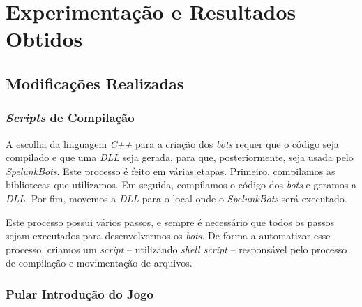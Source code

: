 \chapter{\label{chap:experimentation-and-results}Experimentação e Resultados Obtidos}


\section{\label{section:modifications}Modificações Realizadas}


\subsection{\textit{Scripts} de Compilação}

A escolha da linguagem \textit{C++} para a criação dos \textit{bots} requer que
o código seja compilado e que uma \textit{DLL} seja gerada, para que,
posteriormente, seja usada pelo \textit{SpelunkBots}. Este processo é feito em
várias etapas.  Primeiro, compilamos as bibliotecas que utilizamos. Em seguida,
compilamos o código dos \textit{bots} e geramos a \textit{DLL}. Por fim,
movemos a \textit{DLL} para o local onde o \textit{SpelunkBots} será executado.

Este processo possui vários passos, e sempre é necessário que todos os passos
sejam executados para desenvolvermos os \textit{bots}. De forma a automatizar
esse processo, criamos um \textit{script} -- utilizando \textit{shell script}
-- responsável pelo processo de compilação e movimentação de arquivos.

\subsection{Pular Introdução do Jogo}

